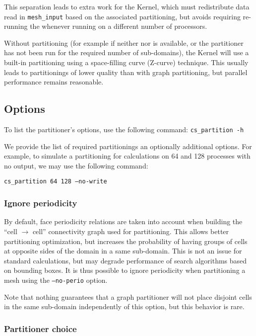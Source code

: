 {{This separation leads to extra work for the Kernel, which must
redistribute data read in {\tt mesh\_input}
based on the associated partitioning, but avoids requiring
re-running the \pcs whenever running on a different number of
processors.

Without partitioning (for example if neither \metis nor
\scotch is available, or the partitioner has not been run
for the required number of sub-domains), the Kernel will
use a built-in partitioning using a space-filling curve
(Z-curve) technique. This usually leads to partitionings
of lower quality than with graph partitioning, but parallel
performance remains reasonable.

\subsection{Options\label{sec:optcmd:parall}}

To list the partitioner's options, use the following command:
{\tt cs\_partition~-h} 

We provide the list of required partitionings an optionally additional
options. For example, to simulate a partitioning for calculations on
64 and 128 processes with no output, we may use the following command:

\texttt{cs\_partition 64 128 --no-write}

\subsubsection{Ignore periodicity\label{sec:optcmdpart:noperiod}}

By default, face periodicity relations are taken into account when building
the ``cell $\rightarrow$ cell'' connectivity graph used for partitioning.
This allows better partitioning optimization, but increases the probability
of having groups of cells at opposite sides of the domain in a same
sub-domain. This is not an issue for standard calculations, but may
degrade performance of search algorithms based on bounding boxes.
It is thus possible to ignore periodicity when partitioning a mesh
using the \texttt{--no-perio} option.

Note that nothing guarantees that a graph partitioner will not place
disjoint cells in the same sub-domain independently of this option,
but this behavior is rare.

\subsubsection{Partitioner choice\label{sec:optpart:partlib}}

}}

